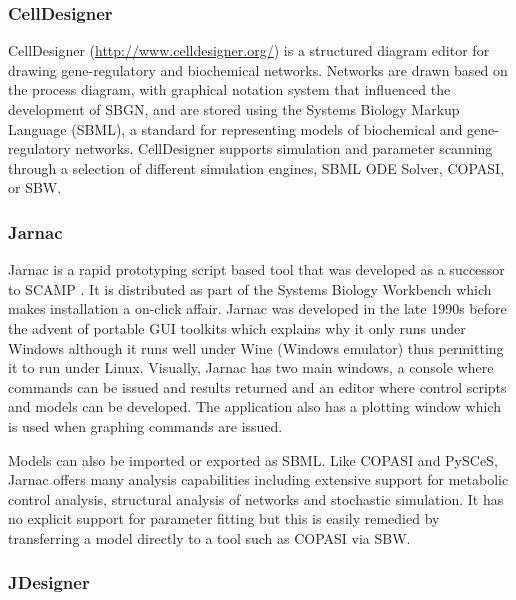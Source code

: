 \subsubsection{CellDesigner}

CellDesigner (\url{http://www.celldesigner.org/})
\autocite{funahashi2003celldesigner}
\autocite{funahashi2008celldesigner} is a structured diagram editor for
drawing gene-regulatory and biochemical networks. Networks are drawn
based on the process diagram, with graphical notation system that
influenced the development of SBGN, and are stored using the Systems
Biology Markup Language (SBML), a standard for representing models of
biochemical and gene-regulatory networks. CellDesigner supports
simulation and parameter scanning through a selection of different
simulation engines, SBML ODE Solver, COPASI, or SBW.

\subsubsection{Jarnac}

Jarnac \autocite{sauro:2000} \autocite{bergmann2006sbw} is a rapid
prototyping script based tool that was developed as a successor to SCAMP
\autocite{SauroF91}. It is distributed as part of the Systems Biology
Workbench which makes installation a on-click affair. Jarnac was
developed in the late 1990s before the advent of portable GUI toolkits
which explains why it only runs under Windows although it runs well
under Wine (Windows emulator) thus permitting it to run under Linux.
Visually, Jarnac has two main windows, a console where commands can be
issued and results returned and an editor where control scripts and
models can be developed. The application also has a plotting window
which is used when graphing commands are issued.

Models can also be imported or exported as SBML. Like
COPASI and PySCeS, Jarnac offers many analysis capabilities including
extensive support for metabolic control analysis, structural analysis of
networks and stochastic simulation. It has no explicit support for
parameter fitting but this is easily remedied by transferring a model
directly to a tool such as COPASI via SBW.

\subsubsection{JDesigner}


